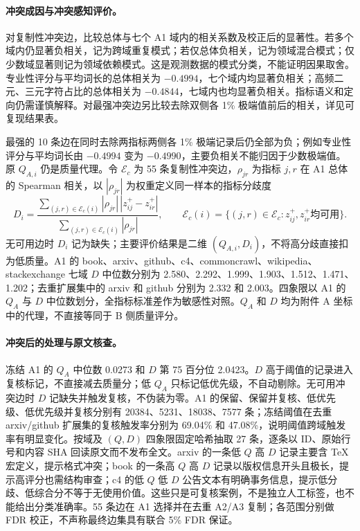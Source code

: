 \paragraph{冲突成因与冲突感知评价。} 对复制性冲突边，比较总体与七个 A1 域内的相关系数及校正后的显著性。若多个域内仍显著负相关，记为跨域重复模式；若仅总体负相关，记为领域混合模式；仅少数域显著则记为领域依赖模式。这是观测数据的模式分类，不能证明因果取舍。专业性评分与平均词长的总体相关为 $-0.4994$，七个域内均显著负相关；高频二元、三元字符占比的总体相关为 $-0.4844$，七域内也均显著负相关。指标语义和定向仍需谨慎解释。对最强冲突边另比较去除双侧各 1\% 极端值前后的相关，详见可复现结果表。

最强的 10 条边在同时去除两指标两侧各 1\% 极端记录后仍全部为负；例如专业性评分与平均词长由 $-0.4994$ 变为 $-0.4990$，主要负相关不能归因于少数极端值。原 $Q_{A,i}$ 仍是质量代理。令 $\mathcal E_c$ 为 55 条复制性冲突边，$\rho_{jr}$ 为指标 $j,r$ 在 A1 总体的 Spearman 相关，以 $|\rho_{jr}|$ 为权重定义同一样本的指标分歧度
\begin{equation}
D_i=\frac{\sum_{(j,r)\in\mathcal E_c(i)}|\rho_{jr}|\,|z^+_{ij}-z^+_{ir}|}{\sum_{(j,r)\in\mathcal E_c(i)}|\rho_{jr}|},
\qquad \mathcal E_c(i)=\{(j,r)\in\mathcal E_c:z^+_{ij},z^+_{ir}\text{均可用}\}.
\label{eq:q1_disagreement}
\end{equation}
无可用边时 $D_i$ 记为缺失；主要评价结果是二维 $(Q_{A,i},D_i)$，不将高分歧直接扣为低质量。A1 的 book、arxiv、github、c4、commoncrawl、wikipedia、stackexchange 七域 $D$ 中位数分别为 2.580、2.292、1.999、1.903、1.512、1.471、1.202；去重扩展集中的 arxiv 和 github 分别为 2.332 和 2.003。四象限以 A1 的 $Q_A$ 与 $D$ 中位数划分，全指标标准差作为敏感性对照。$Q_A$ 和 $D$ 均为附件 A 坐标中的代理，不直接等同于 B 侧质量评分。

\paragraph{冲突后的处理与原文核查。} 冻结 A1 的 $Q_A$ 中位数 0.0273 和 $D$ 第 75 百分位 2.0423。$D$ 高于阈值的记录进入复核标记，不直接减去质量分；低 $Q_A$ 只标记低优先级，不自动剔除。无可用冲突边时 $D$ 记缺失并触发复核，不伪装为零。A1 的保留、保留并复核、低优先级、低优先级并复核分别有 20384、5231、18038、7577 条；冻结阈值在去重 arxiv/github 扩展集的复核触发率分别为 69.04\% 和 47.08\%，说明阈值跨域触发率有明显变化。按域及 $(Q,D)$ 四象限固定哈希抽取 27 条，逐条以 ID、原始行号和内容 SHA 回读原文而不发布全文。arxiv 的一条低 $Q$ 高 $D$ 记录主要含 \TeX{} 宏定义，提示格式冲突；book 的一条高 $Q$ 高 $D$ 记录以版权信息开头且极长，提示高评分也需结构审查；c4 的低 $Q$ 低 $D$ 公告文本有明确事务信息，提示低分歧、低综合分不等于无使用价值。这些只是可复核案例，不是独立人工标签，也不能给出分类准确率。55 条边在 A1 选择并在去重 A2/A3 复制；各范围分别做 FDR 校正，不声称最终边集具有联合 5\% FDR 保证。

